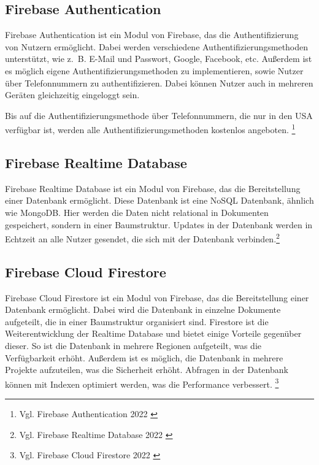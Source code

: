\subsection{Firebase Authentication}
\label{sub:firebase-authentication}

Firebase Authentication ist ein Modul von Firebase, das die Authentifizierung von Nutzern ermöglicht.
Dabei werden verschiedene Authentifizierungsmethoden unterstützt, wie z. B. E-Mail und Passwort, Google, Facebook, etc.
Außerdem ist es möglich eigene Authentifizierungsmethoden zu implementieren, sowie Nutzer über Telefonnummern zu authentifizieren.
Dabei können Nutzer auch in mehreren Geräten gleichzeitig eingeloggt sein.

Bis auf die Authentifizierungsmethode über Telefonnummern, die nur in den USA verfügbar ist, werden alle Authentifizierungsmethoden kostenlos angeboten. \footnote{Vgl. Firebase Authentication 2022 \cite{authentication2022}}

\subsection{Firebase Realtime Database}
\label{sub:firebase-realtime-database}

Firebase Realtime Database ist ein Modul von Firebase, das die Bereitstellung einer Datenbank ermöglicht.
Diese Datenbank ist eine NoSQL Datenbank, ähnlich wie MongoDB.
Hier werden die Daten nicht relational in Dokumenten gespeichert, sondern in einer Baumstruktur.
Updates in der Datenbank werden in Echtzeit an alle Nutzer gesendet, die sich mit der Datenbank verbinden.\footnote{Vgl. Firebase Realtime Database 2022 \cite{realtimedatabase2022}}

\subsection{Firebase Cloud Firestore}
\label{sub:firebase-cloud-firestore}

Firebase Cloud Firestore ist ein Modul von Firebase, das die Bereitstellung einer Datenbank ermöglicht.
Dabei wird die Datenbank in einzelne Dokumente aufgeteilt, die in einer Baumstruktur organisiert sind.
Firestore ist die Weiterentwicklung der Realtime Database und bietet einige Vorteile gegenüber dieser.
So ist die Datenbank in mehrere Regionen aufgeteilt, was die Verfügbarkeit erhöht.
Außerdem ist es möglich, die Datenbank in mehrere Projekte aufzuteilen, was die Sicherheit erhöht.
Abfragen in der Datenbank können mit Indexen optimiert werden, was die Performance verbessert. \footnote{Vgl. Firebase Cloud Firestore 2022 \cite{firestore2022}}

